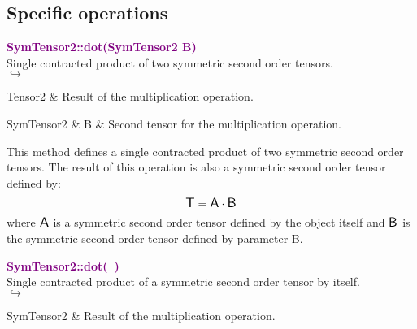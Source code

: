\subsection{Specific operations}

\textcolor{purple}{\textbf{SymTensor2::dot(SymTensor2 B)}}\label{SymTensor2::dot(SymTensor2 B)}\\
Single contracted product of two symmetric second order tensors.\\ \hspace*{5mm}$\hookrightarrow$
\vspace*{-2em}\begin{tcolorbox}[grow to left by=-1cm, width=\textwidth-1cm,myArgs,tabularx={l|R}]
Tensor2 & Result of the multiplication operation.
\end{tcolorbox}

\begin{tcolorbox}[width=\textwidth,myArgs,tabularx={ll|R}]
SymTensor2 & B & Second tensor for the multiplication operation.
\end{tcolorbox}

This method defines a single contracted product of two symmetric second order tensors.
The result of this operation is also a symmetric second order tensor defined by:
\begin{equation*}
\mbox{\large\ensuremath{\mathsf{T}}} = \mbox{\large\ensuremath{\mathsf{A}}} \cdot \mbox{\large\ensuremath{\mathsf{B}}}
\end{equation*}
where $\mbox{\large\ensuremath{\mathsf{A}}}$ is a symmetric second order tensor defined by the object itself and $\mbox{\large\ensuremath{\mathsf{B}}}$ is the symmetric second order tensor defined by parameter B.

\textcolor{purple}{\textbf{SymTensor2::dot(~)}}\label{SymTensor2::dot()}\\
Single contracted product of a symmetric second order tensor by itself.\\ \hspace*{5mm}$\hookrightarrow$
\vspace*{-2em}\begin{tcolorbox}[grow to left by=-1cm, width=\textwidth-1cm,myArgs,tabularx={l|R}]
SymTensor2 & Result of the multiplication operation.
\end{tcolorbox}

